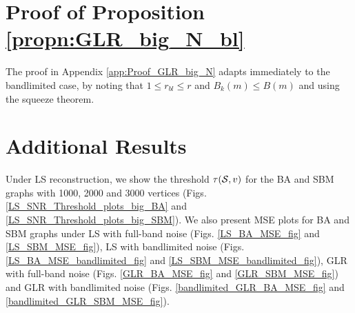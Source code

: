 \section{Proof of Proposition \ref{propn:GLR_big_N_bl}}
\label{app:Proof_GLR_big_N_bl}
The proof in Appendix \ref{app:Proof_GLR_big_N} adapts immediately to the bandlimited case, by noting that $1 \leq r_{bl} \leq r$ and $B_{k}(m) \leq B(m)$ and using the squeeze theorem. 

\section{Additional Results}
\label{plot_appendix}
Under LS reconstruction, we show the threshold $\tau(\mathcal{S},v)$ for the BA and SBM graphs with 1000, 2000 and 3000 vertices (Figs. 
\ref{LS_SNR_Threshold_plots_big_BA} and  \ref{LS_SNR_Threshold_plots_big_SBM}). We also present MSE plots for BA and SBM graphs under LS with full-band noise (Figs. \ref{LS_BA_MSE_fig} and \ref{LS_SBM_MSE_fig}), LS with bandlimited noise (Figs. \ref{LS_BA_MSE_bandlimited_fig} and  \ref{LS_SBM_MSE_bandlimited_fig}),  GLR with full-band noise (Figs. \ref{GLR_BA_MSE_fig} and  \ref{GLR_SBM_MSE_fig}) and GLR with bandlimited noise (Figs. \ref{bandlimited_GLR_BA_MSE_fig} and  \ref{bandlimited_GLR_SBM_MSE_fig}).


